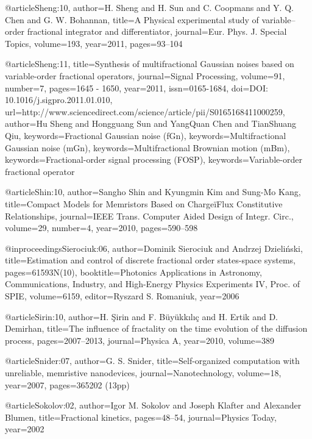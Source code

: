 \begin{thebibliography}{99}
@article{Sheng:10,
  author={H. Sheng and H. Sun and C. Coopmans and Y. Q. Chen and G. W. Bohannan},
  title={A Physical experimental study of variable--order fractional integrator
    and differentiator},
  journal={Eur. Phys. J. Special Topics},
  volume={193},
  year={2011},
  pages={93--104}
}

@article{Sheng:11,
  title={Synthesis of multifractional Gaussian noises based on variable-order fractional
    operators},
  journal={Signal Processing},
  volume={91},
  number={7},
  pages={1645 - 1650},
  year={2011},
  issn={0165-1684},
  doi={DOI: 10.1016/j.sigpro.2011.01.010},
  url={http://www.sciencedirect.com/science/article/pii/S0165168411000259},
  author={Hu Sheng and Hongguang Sun and YangQuan Chen and TianShuang Qiu},
  keywords={Fractional Gaussian noise (fGn)},
  keywords={Multifractional Gaussian noise (mGn)},
  keywords={Multifractional Brownian motion (mBm)},
  keywords={Fractional-order signal processing (FOSP)},
  keywords={Variable-order fractional operator}
}

@article{Shin:10,
  author={Sangho Shin and Kyungmin Kim and Sung-Mo Kang},
  title={Compact Models for Memristors Based on Charge{\"i}{\textquestiondown}{\textonehalf}Flux
    Constitutive Relationships},
  journal={IEEE Trans. Computer Aided Design of Integr. Circ.},
  volume={29},
  number={4},
  year={2010},
  pages={590--598}
}

@inproceedings{Sierociuk:06,
  author={Dominik Sierociuk and Andrzej Dzieli\'{n}ski},
  title={Estimation and control of discrete fractional order states-space systems},
  pages={61593N(10)},
  booktitle={Photonics Applications in Astronomy, Communications, Industry, and
    High-Energy Physics Experiments {IV}, Proc. of SPIE},
  volume={6159},
  editor={Ryszard S. Romaniuk},
  year={2006}
}

@article{Sirin:10,
  author={H. \c{S}irin and F. B\"{u}y\"{u}kk{\i}l{\i}\c{c} and H. Ertik and D.
    Demirhan},
  title={The influence of fractality on the time evolution of the diffusion process},
  pages={2007--2013},
  journal={Physica A},
  year={2010},
  volume={389}
}

@article{Snider:07,
  author={G. S. Snider},
  title={Self-organized computation with unreliable, memristive nanodevices},
  journal={Nanotechnology},
  volume={18},
  year={2007},
  pages={365202 (13pp)}
}

@article{Sokolov:02,
  author={Igor M. Sokolov and Joseph Klafter and Alexander Blumen},
  title={Fractional kinetics},
  pages={48--54},
  journal={Physics Today},
  year={2002}
}


\end{thebibliography}
